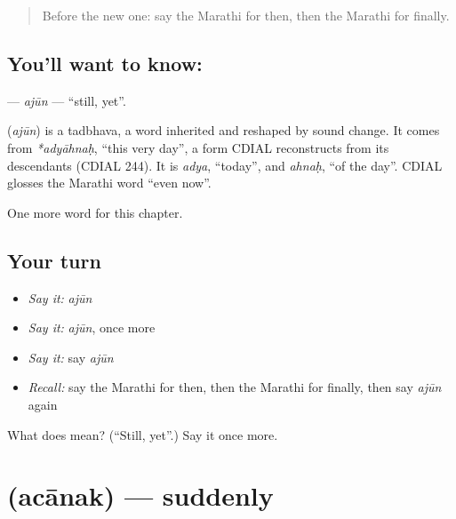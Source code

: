 \label{lesson:MR-C171-ajun}



\begin{quote}
Before the new one: say the Marathi for then, then the Marathi for finally.
\end{quote}

\subsection*{You'll want to know: }
\textbf{} — \emph{ajūn} — \textquotedblleft{}still, yet\textquotedblright{}.

\begin{cousinweb}
\textbf{} (\emph{ajūn}) is a tadbhava, a word inherited and reshaped by sound change. It comes from \emph{*adyāhnaḥ}, \textquotedblleft{}this very day\textquotedblright{}, a form CDIAL reconstructs from its descendants (CDIAL 244). It is \emph{adya}, \textquotedblleft{}today\textquotedblright{}, and \emph{ahnaḥ}, \textquotedblleft{}of the day\textquotedblright{}. CDIAL glosses the Marathi word \textquotedblleft{}even now\textquotedblright{}.
\end{cousinweb}

\begin{grammarlens}[title={What you've built}]
One more word for this chapter.
\end{grammarlens}

\subsection*{Your turn}
\begin{itemize}
\raggedright
  \item \emph{Say it:} \emph{ajūn}
  \item \emph{Say it:} \emph{ajūn}, once more
  \item \emph{Say it:} say \emph{ajūn}
  \item \emph{Recall:} say the Marathi for then, then the Marathi for finally, then say \emph{ajūn} again
\end{itemize}

\begin{tcolorbox}[breakable,colback=teal!4,colframe=teal!35!black,title={Before you move on}]
What does  mean? (\textquotedblleft{}Still, yet\textquotedblright{}.) Say it once more.
\end{tcolorbox}
\section[\texorpdfstring{\mr{अचानक} (acānak)}{अचानक (acānak)}]{ (acānak) — suddenly}


